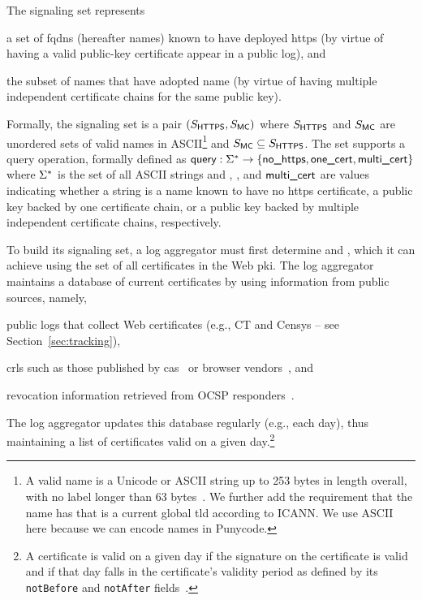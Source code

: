 The signaling set represents
\begin{inparaenum}
\item a set of \acp{fqdn} (hereafter names) known to have deployed \ac{https}
  (by virtue of having a valid public-key certificate appear in a public log), and
\item the subset of names that have adopted \ac{name} (by
  virtue of having multiple independent certificate chains for the same public
  key).
\end{inparaenum}
Formally, the signaling set is a pair $(S_{\textsf{HTTPS}}, S_{\textsf{MC}})$ where
$S_{\textsf{HTTPS}}$ and $S_{\textsf{MC}}$ are unordered sets of valid names in
ASCII\footnote{A valid name is a Unicode or ASCII string up to 253 bytes in
  length overall, with no label longer than 63 bytes~\cite{rfc1035}. We further
add the requirement that the name has  that is a current global
\ac{tld} according to ICANN. We use ASCII here because we can encode names in
Punycode.} and $S_{\textsf{MC}} \subseteq S_{\textsf{HTTPS}}$. The set supports a query
operation, formally defined as $\textsf{query}: \Sigma^* \to \{\textsf{no\_https}, \textsf{one\_cert},
\textsf{multi\_cert}\}$ where $\Sigma^*$ is the set of all ASCII strings and \nohttps,
\onecert, and $\textsf{multi\_cert}$ are values indicating whether a string is a name
known to have no \ac{https} certificate, a public key backed by one certificate
chain, or a public key backed by multiple independent certificate chains,
respectively.

To build its signaling set, a log aggregator must first determine \httpsset
and \multicertset, which it can achieve using the set of all certificates in the
Web \ac{pki}. The log aggregator maintains a database of current certificates by
using information from public sources, namely,
\begin{inparaenum}
\item public logs that collect Web certificates 
  (e.g., CT and Censys -- see Section~\ref{sec:tracking}),
\item \acp{crl} such as those published by \acp{ca}~\cite{rfc5280} or browser
  vendors~\cite{langley2012revocation, goodwin2015revoking}, and
\item revocation information retrieved from OCSP responders~\cite{rfc6960}.
\end{inparaenum}
The log aggregator updates this database regularly (e.g., each day), thus
maintaining a list of certificates valid on a given day.\footnote{A certificate
  is valid on a given day if the signature on the certificate is valid and if
  that day falls in the certificate's validity period as defined by its
\texttt{notBefore} and \texttt{notAfter} fields~\cite{rfc5280}.}

